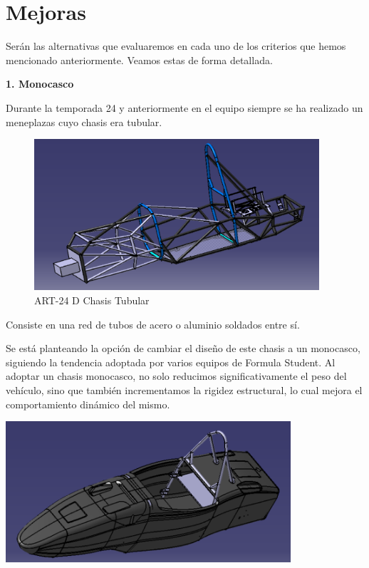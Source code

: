 \documentclass[
]{article}
\begin{document}
\newpage

\section{Mejoras}\label{mejoras}

Serán las alternativas que evaluaremos en cada uno de los criterios que
hemos mencionado anteriormente. Veamos estas de forma detallada.

\textbf{1. Monocasco}

Durante la temporada 24 y anteriormente en el equipo siempre se ha
realizado un meneplazas cuyo chasis era tubular.

\begin{figure}
\centering
\includegraphics[width=4.16667in,height=\textheight]{Fotos/chasistubular.png}
\caption{ART-24 D Chasis Tubular}
\end{figure}

Consiste en una red de tubos de acero o aluminio soldados entre sí.

Se está planteando la opción de cambiar el diseño de este chasis a un
monocasco, siguiendo la tendencia adoptada por varios equipos de Formula
Student. Al adoptar un chasis monocasco, no solo reducimos
significativamente el peso del vehículo, sino que también incrementamos
la rigidez estructural, lo cual mejora el comportamiento dinámico del
mismo.

\includegraphics[width=4.16667in,height=\textheight]{Fotos/monocasco.png}
\newpage
\end{document}
